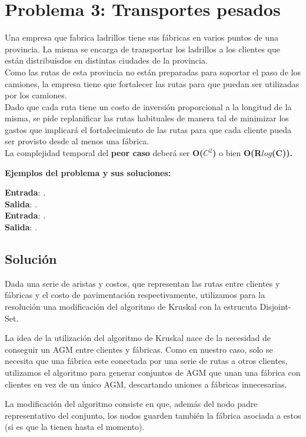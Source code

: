 \documentclass[a4paper, 10pt, twoside]{article}
\begin{document}
\newpage

\section{Problema 3: Transportes pesados}

Una empresa que fabrica ladrillos tiene sus fábricas en varios puntos de una provincia. La misma se encarga de transportar los ladrillos a los clientes que están distribuísdos en distintas ciudades de la provincia.\\
Como las rutas de esta provincia no están preparadas para soportar el paso de los camiones, la empresa tiene que fortalecer las rutas para que puedan ser utilizadas por los camiones.\\
Dado que cada ruta tiene un costo de inversión proporcional a la longitud de la misma, se pide replanificar las rutas habituales de manera tal de minimizar los gastos que implicará el fortalecimiento de las rutas para que cada cliente pueda ser provisto desde al menos una fábrica.\\
La complejidad temporal del \textbf{peor caso} deberá ser \textbf{O($C^2$)} o bien \textbf{O(R$log$(C)).}

\textbf{Ejemplos del problema y sus soluciones:}

\textbf{Entrada}: . \\
\textbf{Salida}: . \\

\textbf{Entrada}: . \\
\textbf{Salida}: . \\

\subsection{Solución}
Dada una serie de aristas y costos, que representan las rutas entre clientes y fábricas y el costo de pavimentación respectivamente, utilizamos para la resolución una modificación del algoritmo de Kruskal con la estrucuta Disjoint-Set.

La idea de la utilización del algoritmo de Kruskal nace de la necesidad de conseguir un AGM entre clientes y fábricas. Como en nuestro caso, solo se necesita que una fábrica este conectada por una serie de rutas a otros clientes, utilizamos el algoritmo para generar conjuntos de AGM que unan una fábrica con clientes en vez de un único AGM, descartando uniones a fábricas innecesarias.

La modificación del algoritmo consiste en que, además del nodo padre representativo del conjunto, los nodos guarden también la fábrica asociada a estos (si es que la tienen hasta el momento).
\end{document}
